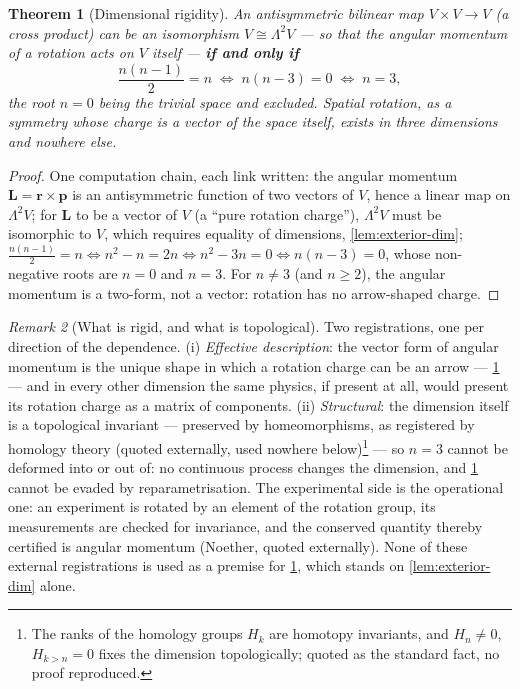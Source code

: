 \documentclass[11pt]{amsbook}
\theoremstyle{plain}
\newtheorem{theorem}{Theorem}[chapter]
\theoremstyle{definition}
\theoremstyle{remark}
\newtheorem{remark}[theorem]{Remark}
\newcommand{\uses}[1]{\par\nopagebreak\noindent{\footnotesize\emph{Uses: #1.}\par}}
\begin{document}
\begin{theorem}[Dimensional rigidity]\label{thm:rigidity}
An antisymmetric bilinear map $V \times V \to V$ (a cross product) can be an isomorphism $V \cong \Lambda^{2}V$ --- so that the angular momentum of a rotation acts on $V$ itself --- \textbf{if and only if}
\begin{equation}\label{eq:rigidity}
\frac{n(n-1)}{2} = n \;\Longleftrightarrow\; n(n-3) = 0 \;\Longleftrightarrow\; n = 3,
\end{equation}
the root $n = 0$ being the trivial space and excluded. Spatial rotation, as a symmetry whose charge is a vector of the space itself, exists in three dimensions and nowhere else.
\uses{\cref{lem:exterior-dim}}
\end{theorem}

\begin{proof}
One computation chain, each link written: the angular momentum $\mathbf L = \mathbf r \times \mathbf p$ is an antisymmetric function of two vectors of $V$, hence a linear map on $\Lambda^{2}V$; for $\mathbf L$ to be a vector of $V$ (a ``pure rotation charge''), $\Lambda^{2}V$ must be isomorphic to $V$, which requires equality of dimensions, \cref{lem:exterior-dim}; $\frac{n(n-1)}{2} = n \Leftrightarrow n^{2} - n = 2n \Leftrightarrow n^{2} - 3n = 0 \Leftrightarrow n(n-3) = 0$, whose non-negative roots are $n = 0$ and $n = 3$. For $n \neq 3$ (and $n \geq 2$), the angular momentum is a two-form, not a vector: rotation has no arrow-shaped charge.
\end{proof}

\begin{remark}[What is rigid, and what is topological]\label{rem:topological}
Two registrations, one per direction of the dependence. (i) \emph{Effective description}: the vector form of angular momentum is the unique shape in which a rotation charge can be an arrow --- \cref{thm:rigidity} --- and in every other dimension the same physics, if present at all, would present its rotation charge as a matrix of components. (ii) \emph{Structural}: the dimension itself is a topological invariant --- preserved by homeomorphisms, as registered by homology theory (quoted externally, used nowhere below)\footnote{The ranks of the homology groups $H_{k}$ are homotopy invariants, and $H_{n} \neq 0$, $H_{k>n} = 0$ fixes the dimension topologically; quoted as the standard fact, no proof reproduced.} --- so $n = 3$ cannot be deformed into or out of: no continuous process changes the dimension, and \cref{thm:rigidity} cannot be evaded by reparametrisation. The experimental side is the operational one: an experiment is rotated by an element of the rotation group, its measurements are checked for invariance, and the conserved quantity thereby certified is angular momentum (Noether, quoted externally). None of these external registrations is used as a premise for \cref{thm:rigidity}, which stands on \cref{lem:exterior-dim} alone.
\end{remark}
\end{document}
